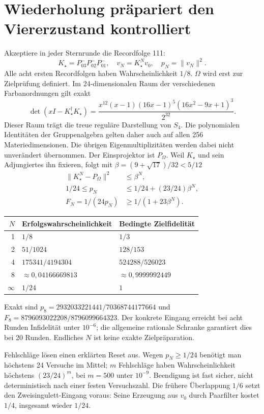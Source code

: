 \section{Wiederholung präpariert den Viererzustand kontrolliert}
Akzeptiere in jeder Sternrunde die Recordfolge 111:
\begin{equation}
K_\star=P^-_{03}P^-_{02}P^-_{01},\quad v_N=K_\star^Nv_0,\quad p_N=\|v_N\|^2.
\end{equation}
Alle acht ersten Recordfolgen haben Wahrscheinlichkeit $1/8$. $\Omega$ wird erst zur Zielprüfung definiert. Im 24-dimensionalen Raum der verschiedenen Farbanordnungen gilt exakt
\begin{equation}
\det(xI-K_\star^\dagger K_\star)=
\frac{x^{12}(x-1)(16x-1)^5(16x^2-9x+1)^3}{2^{32}}.
\end{equation}
Dieser Raum trägt die treue reguläre Darstellung von $S_4$. Die polynomialen Identitäten der Gruppenalgebra gelten daher auch auf allen 256 Materiedimensionen. Die übrigen Eigenmultiplizitäten werden dabei nicht unverändert übernommen. Der Einsprojektor ist $P_\Omega$. Weil $K_\star$ und sein Adjungiertes ihn fixieren, folgt mit $\beta=(9+\sqrt{17})/32<5/12$
\begin{align}
\|K_\star^N-P_\Omega\|^2&\le\beta^N,\\
1/24\le p_N&\le1/24+(23/24)\beta^N,\\
F_N=1/(24p_N)&\ge1/(1+23\beta^N).
\end{align}
\begin{center}\begin{tabular}{rll}
\toprule $N$&Erfolgswahrscheinlichkeit&Bedingte Zielfidelität\\\midrule
1&$1/8$&$1/3$\\
2&$51/1024$&$128/153$\\
4&$175341/4194304$&$524288/526023$\\
8&$\approx0{,}04166669813$&$\approx0{,}9999992449$\\
$\infty$&$1/24$&$1$\\\bottomrule
\end{tabular}\end{center}
Exakt sind $p_8=2932033221441/70368744177664$ und
$F_8=8796093022208/8796099664323$. Der konkrete Eingang erreicht bei acht Runden Infidelität unter $10^{-6}$; die allgemeine rationale Schranke garantiert dies bei 20 Runden. Endliches $N$ ist keine exakte Zielpräparation.

Fehlschläge lösen einen erklärten Reset aus. Wegen $p_N\ge1/24$ benötigt man höchstens 24 Versuche im Mittel; $m$ Fehlschläge haben Wahrscheinlichkeit höchstens $(23/24)^m$, bei $m=500$ unter $10^{-9}$. Beendigung ist fast sicher, nicht deterministisch nach einer festen Versuchszahl. Die frühere Überlappung $1/6$ setzt den Zweisingulett-Eingang voraus: Seine Erzeugung aus $v_0$ durch Paarfilter kostet $1/4$, insgesamt wieder $1/24$.

